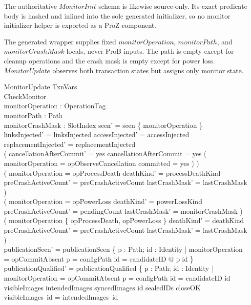 \documentclass{article}
\begin{document}
The authoritative $MonitorInit$ schema is likewise source-only.  Its exact
predicate body is hashed and inlined into the sole generated initializer, so no
monitor initializer helper is exported as a ProZ component.

The generated wrapper supplies fixed $monitorOperation$, $monitorPath$, and
$monitorCrashMask$ locals, never ProB inputs.  The path is empty except for
cleanup operations and the crash mask is empty except for power loss.
$MonitorUpdate$ observes both transaction states but assigns only monitor state.

\begin{schema}{MonitorUpdate}
	\Delta TxnVars \\
	\Delta CheckMonitor \\
	monitorOperation : OperationTag \\
	monitorPath : \power Path \\
	monitorCrashMask : \power SlotIndex
	\where
	seen' = seen \cup \{ monitorOperation \} \\
	linksInjected' = linksInjected \land accessInjected' = accessInjected \land
	replacementInjected' = replacementInjected \\
	( cancellationAfterCommit' = yes \iff cancellationAfterCommit = yes \lor
	( monitorOperation = opObserveCancellation \land committed = yes ) ) \\
	( monitorOperation = opProcessDeath \implies deathKind' = processDeathKind \land
	preCrashActiveCount' = preCrashActiveCount \land lastCrashMask' = lastCrashMask ) \\
	( monitorOperation = opPowerLoss \implies deathKind' = powerLossKind \land
	preCrashActiveCount' = pendingCount \land lastCrashMask' = monitorCrashMask ) \\
	( monitorOperation \notin \{ opProcessDeath, opPowerLoss \} \implies
	deathKind' = deathKind \land preCrashActiveCount' = preCrashActiveCount \land
	lastCrashMask' = lastCrashMask ) \\
	publicationSeen' = publicationSeen \cup
	\{ p : Path; id : Identity |
	monitorOperation = opCommitAbsent \land p = configPath \land id = candidateID @
	p \mapsto id \} \\
	publicationQualified' = publicationQualified \cup
	\{ p : Path; id : Identity |
	monitorOperation = opCommitAbsent \land p = configPath \land id = candidateID \land
	id \in \dom visibleImages \cap \dom intendedImages \cap \dom syncedImages \land
	id \in sealedIDs \cap closeOK \land visibleImages~id = intendedImages~id \land

\end{schema}
\end{document}
